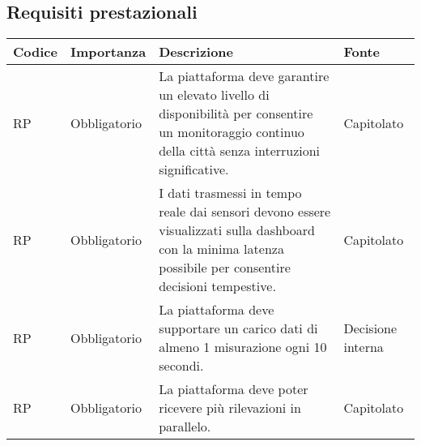 \subsection{Requisiti prestazionali}
\setcounter{rowcounter}{0}
\begin{longtable}{|C{1cm}|C{2cm}|>{\raggedright}m{5cm}|C{2cm}|}
    \hline
    \textbf{Codice}                                & \textbf{Importanza} & \textbf{Descrizione}                                                                                                                                                                               & \textbf{Fonte}  \\
    \hline
    RP           & Obbligatorio               & La piattaforma deve garantire un elevato livello di disponibilità per consentire un monitoraggio continuo della città senza interruzioni significative.  & Capitolato \\ 
    \hline
     RP & Obbligatorio        & I dati trasmessi in tempo reale dai sensori devono essere visualizzati sulla dashboard con la minima latenza possibile per consentire decisioni tempestive.                                        & Capitolato \\
    \hline
     RP & Obbligatorio        & La piattaforma deve supportare un carico dati di almeno 1 misurazione ogni 10 secondi. & Decisione interna \\
    \hline
     RP & Obbligatorio        & La piattaforma deve poter ricevere più rilevazioni in parallelo. & Capitolato \\
    \hline
\end{longtable}
